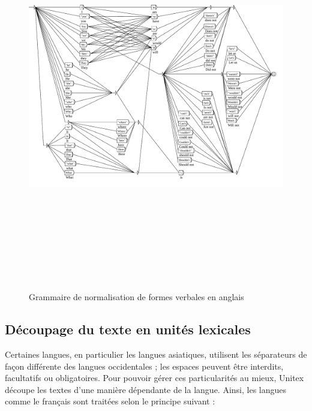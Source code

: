 \begin{figure}[!p]
\begin{center}
\includegraphics[height=17cm,angle=90]{resources/img/fig2-11.pdf}
\caption{Grammaire de normalisation de formes verbales en anglais\label{fig-normalization-grammar}}
\end{center}
\end{figure}



\subsection{Découpage du texte en unités lexicales}
\label{tokenization}
Certaines langues, en particulier les langues asiatiques, utilisent les séparateurs de façon
différente des langues occidentales ; les espaces peuvent être interdits, facultatifs ou
obligatoires. Pour pouvoir gérer ces particularités au mieux, Unitex découpe les textes d’une
manière dépendante de la langue. Ainsi, les langues comme le français sont traitées selon le
principe suivant :


